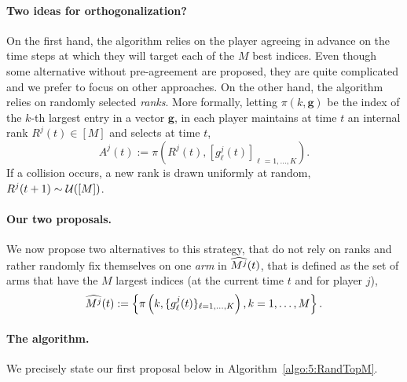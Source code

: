 \paragraph{Two ideas for orthogonalization?}
\label{par:5:twoIdeasOrthogonalization}
%
On the first hand, the \TDFS{} algorithm \citep{Zhao10} relies on the player agreeing in advance on the time steps at which they will target each of the $M$ best indices.
Even though some alternative without pre-agreement are proposed, they are quite complicated and we prefer to focus on other approaches.
%
On the other hand, the \rhoRand{} algorithm \citep{Anandkumar11} relies on randomly selected \emph{ranks}. %
%
More formally, letting $\pi(k,\mathbf{g})$ be the index of the $k$-th largest entry in a vector $\mathbf{g}$,
in \rhoRand{} each player maintains at time $t$ an internal rank $R^j(t)\in[M]$
and selects at time $t$,
\begin{equation}
  A^j(t) := \pi\left(R^j(t), [g^j_\ell(t)]_{\ell=1,\dots,K}\right).
\end{equation}
If a collision occurs, a new rank is drawn uniformly at random, $R^j(t+1) \sim \mathcal{U}([M])$.


\paragraph{Our two proposals.}
We now propose two alternatives to this strategy, that do not rely on ranks and rather randomly fix themselves on one \emph{arm} in $\widehat{M^j}(t)$, that is defined as the set of arms that have the $M$ largest indices (at the current time $t$ and for player $j$),
\begin{equation}
  \widehat{M^j}(t) := \left\{ \pi\left(k, \{g^j_\ell(t)\}_{\ell=1,\dots,K}\right), k=1,\dots,M\right\}.
\end{equation}


\paragraph{The \RandTopM{} algorithm.}
%
We precisely state our first proposal below in Algorithm~\ref{algo:5:RandTopM}.

